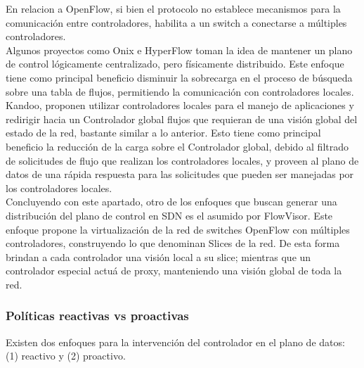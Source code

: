 En relacion a OpenFlow, si bien el protocolo no establece mecanismos para la comunicación entre controladores, habilita a un switch a conectarse a múltiples controladores.\\

Algunos proyectos como Onix\cite{koponen2014distributed} e HyperFlow\cite{tootoonchian2010hyperflow} toman la idea de mantener un plano de control lógicamente centralizado, pero físicamente distribuido. Este enfoque tiene como principal beneficio disminuir la sobrecarga en el proceso de búsqueda sobre una tabla de flujos, permitiendo la comunicación con controladores locales.\\

Kandoo\cite{hassas2012kandoo}, proponen utilizar controladores locales para el manejo de aplicaciones y redirigir hacia un Controlador global flujos que requieran de una visión global del estado de la red, bastante similar a lo anterior. Esto tiene como principal beneficio la reducción de la carga sobre el Controlador global, debido al filtrado de solicitudes de flujo que realizan los controladores locales, y proveen al plano de datos de una rápida respuesta para las solicitudes que pueden ser manejadas por los controladores locales.\\

Concluyendo con este apartado, otro de los enfoques que buscan generar una distribución del plano de control en SDN es el asumido por FlowVisor\cite{sherwood2010carving}. Este enfoque propone la virtualización de la red de switches OpenFlow con múltiples controladores, construyendo lo que denominan Slices de la red. De esta forma brindan a cada controlador una visión local a su slice; mientras que un controlador especial actuá de proxy, manteniendo una visión global de toda la red.

\subsubsection{Políticas reactivas vs proactivas}
Existen dos enfoques para la intervención del controlador en el plano de datos: (1) reactivo y (2) proactivo.


